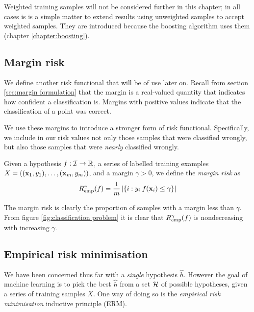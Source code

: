 Weighted training samples will not be considered further in this
chapter; in all cases is is a simple matter to extend results using
unweighted samples to accept weighted samples.  They are introduced
because the boosting algorithm uses them (chapter
\ref{chapter:boosting}).


\subsection{Margin risk}
\label{sec:margin risk}

We define another risk functional that will be of use later on.
Recall from section \ref{sec:margin formulation} that the margin is a
real-valued quantity that indicates how confident a classification
is.  Margins with positive values indicate that the classification of
a point was correct.

We use these margins to introduce a stronger form of risk functional.
Specifically, we include in our risk values not only those samples
that were classified wrongly, but also those samples that were
\emph{nearly} classified wrongly. 

\begin{definition}
\label{def:margin risk}
Given a hypothesis $f : \mathcal{I} \rightarrow \mathbb{R}$, a series of
labelled training examples $X = ((\mathbf{x}_1, y_1), \ldots, (\mathbf{x}_m, y_m))$,
and a margin $\gamma>0$, we define the \emph{margin risk} as
%
\begin{equation}
R^{\gamma}_{\mathrm{emp}}(f) = \frac{1}{m} \left| \left\{ i : y_i \: f(\mathbf{x}_i) \leq
\gamma \right\} \right| 
\end{equation}
\end{definition}
%
The margin risk is clearly the proportion of samples with a margin
less than $\gamma$.  From figure \ref{fig:classification problem} it
is clear that $R^{\gamma}_{\mathrm{emp}}(f)$ is nondecreasing with increasing
$\gamma$.


\subsection{Empirical risk minimisation}
\label{sec:srm}
\label{acr:erm}

We have been concerned thus far with a \emph{single} hypothesis
$\hat{h}$.  However the goal of machine learning is to 
pick the best $\hat{h}$ from a set $\mathcal{H}$ of possible hypotheses,
given a series of training samples $X$.  One way of doing so is the
\emph{empirical risk minimisation} inductive principle (ERM).

